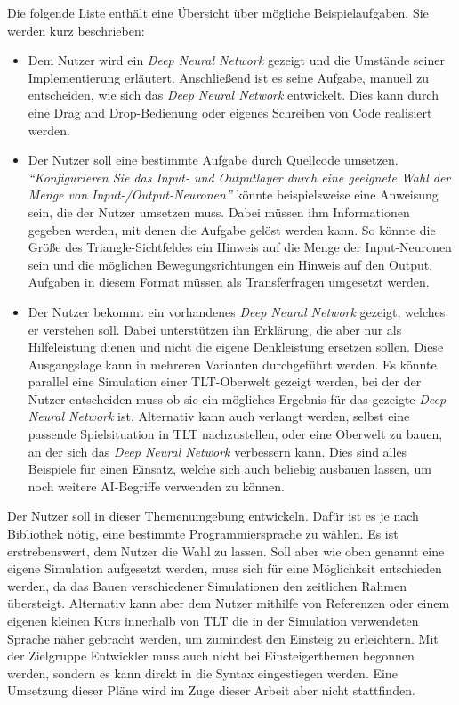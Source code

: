 Die folgende Liste enthält eine Übersicht über mögliche Beispielaufgaben. Sie werden kurz beschrieben:

\begin{itemize}
\item Dem Nutzer wird ein \textit{Deep Neural Network} gezeigt und die Umstände seiner Implementierung erläutert. Anschließend ist es seine Aufgabe, manuell zu entscheiden, wie sich das \textit{Deep Neural Network} entwickelt. Dies kann durch eine \glqq Drag and Drop\grqq{}-Bedienung oder eigenes Schreiben von Code realisiert werden.
\item Der Nutzer soll eine bestimmte Aufgabe durch Quellcode umsetzen. \textit{"`Konfigurieren Sie das Input- und Outputlayer durch eine geeignete Wahl der Menge von Input-/Output-Neuronen"'} könnte beispielsweise eine Anweisung sein, die der Nutzer umsetzen muss. Dabei müssen ihm Informationen gegeben werden, mit denen die Aufgabe gelöst werden kann. So könnte die Größe des Triangle-Sichtfeldes ein Hinweis auf die Menge der Input-Neuronen sein und die möglichen Bewegungsrichtungen ein Hinweis auf den Output. Aufgaben in diesem Format müssen als Transferfragen umgesetzt werden. 
\item Der Nutzer bekommt ein vorhandenes \textit{Deep Neural Network} gezeigt, welches er verstehen soll. Dabei unterstützen ihn Erklärung, die aber nur als Hilfeleistung dienen und nicht die eigene Denkleistung ersetzen sollen. Diese Ausgangslage kann in mehreren Varianten durchgeführt werden. Es könnte parallel eine Simulation einer TLT-Oberwelt gezeigt werden, bei der der Nutzer entscheiden muss ob sie ein mögliches Ergebnis für das gezeigte \textit{Deep Neural Network} ist. Alternativ kann auch verlangt werden, selbst eine passende Spielsituation in TLT nachzustellen, oder eine Oberwelt zu bauen, an der sich das \textit{Deep Neural Network} verbessern kann. Dies sind alles Beispiele für einen Einsatz, welche sich auch beliebig ausbauen lassen, um noch weitere AI-Begriffe verwenden zu können.
\end{itemize}

Der Nutzer soll in dieser Themenumgebung entwickeln. Dafür ist es je nach Bibliothek nötig, eine bestimmte Programmiersprache zu wählen. Es ist erstrebenswert, dem Nutzer die Wahl zu lassen. Soll aber wie oben genannt eine eigene Simulation aufgesetzt werden, muss sich für eine Möglichkeit entschieden werden, da das Bauen verschiedener Simulationen den zeitlichen Rahmen übersteigt. Alternativ kann aber dem Nutzer mithilfe von Referenzen oder einem eigenen kleinen Kurs innerhalb von TLT die in der Simulation verwendeten Sprache näher gebracht werden, um zumindest den Einsteig zu erleichtern. Mit der Zielgruppe Entwickler muss auch nicht bei Einsteigerthemen begonnen werden, sondern es kann direkt in die Syntax eingestiegen werden. Eine Umsetzung dieser Pläne wird im Zuge dieser Arbeit aber nicht stattfinden.

